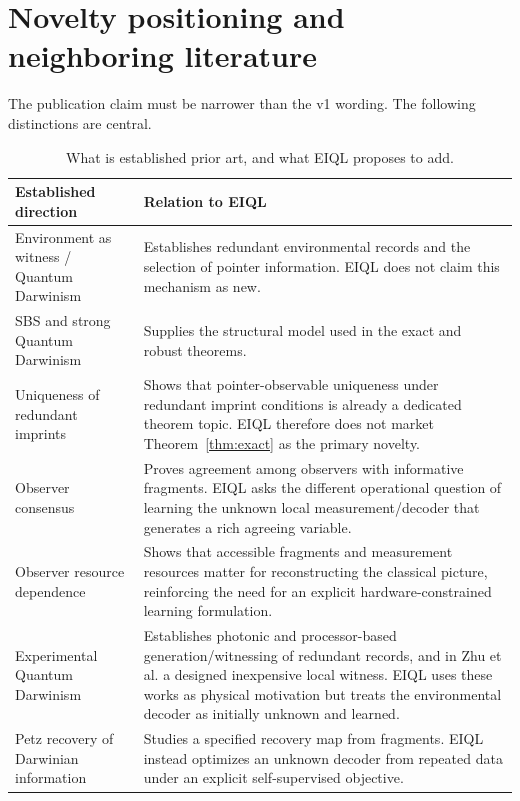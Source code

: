 \section{Novelty positioning and neighboring literature}

The publication claim must be narrower than the v1 wording. The following distinctions are central.

\begin{table}[H]
\centering
\caption{What is established prior art, and what EIQL proposes to add.}
\begin{tabularx}{\textwidth}{>{\raggedright\arraybackslash}p{}X}
\toprule
Established direction & Relation to EIQL \\
\midrule
Environment as witness / Quantum Darwinism \cite{ollivier2004,ollivier2005} & Establishes redundant environmental records and the selection of pointer information. EIQL does not claim this mechanism as new.\\
SBS and strong Quantum Darwinism \cite{horodecki2015,le2019} & Supplies the structural model used in the exact and robust theorems.\\
Uniqueness of redundant imprints \cite{fu2021} & Shows that pointer-observable uniqueness under redundant imprint conditions is already a dedicated theorem topic. EIQL therefore does not market Theorem~\ref{thm:exact} as the primary novelty.\\
Observer consensus \cite{touil2025} & Proves agreement among observers with informative fragments. EIQL asks the different operational question of learning the unknown local measurement/decoder that generates a rich agreeing variable.\\
Observer resource dependence \cite{feller2023} & Shows that accessible fragments and measurement resources matter for reconstructing the classical picture, reinforcing the need for an explicit hardware-constrained learning formulation.\\
Experimental Quantum Darwinism \cite{chen2019,saini2020,chisholm2022,zhu2025} & Establishes photonic and processor-based generation/witnessing of redundant records, and in Zhu et al. a designed inexpensive local witness. EIQL uses these works as physical motivation but treats the environmental decoder as initially unknown and learned.\\
Petz recovery of Darwinian information \cite{torvinen2026} & Studies a specified recovery map from fragments. EIQL instead optimizes an unknown decoder from repeated data under an explicit self-supervised objective.\\

\end{tabularx}
\end{table}
